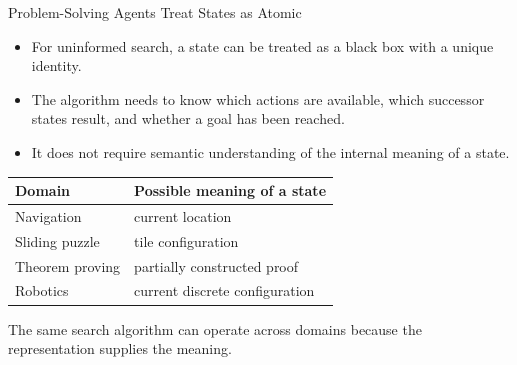 \documentclass[aspectratio=169,10pt]{beamer}
\begin{document}
\begin{frame}[shrink=20]{Problem-Solving Agents Treat States as Atomic}
  \begin{itemize}
    \item For uninformed search, a state can be treated as a black box with a unique identity.
    \item The algorithm needs to know which actions are available, which successor states result, and whether a goal has been reached.
    \item It does not require semantic understanding of the internal meaning of a state.
  \end{itemize}

  \begin{center}
    \renewcommand{\arraystretch}{1.25}
    \begin{tabular}{l|l}
      \textbf{Domain} & \textbf{Possible meaning of a state} \\\hline
      Navigation & current location \\
      Sliding puzzle & tile configuration \\
      Theorem proving & partially constructed proof \\
      Robotics & current discrete configuration
    \end{tabular}
  \end{center}

  \begin{keyidea}
    The same search algorithm can operate across domains because the representation supplies the meaning.
  \end{keyidea}
\end{frame}
\end{document}
